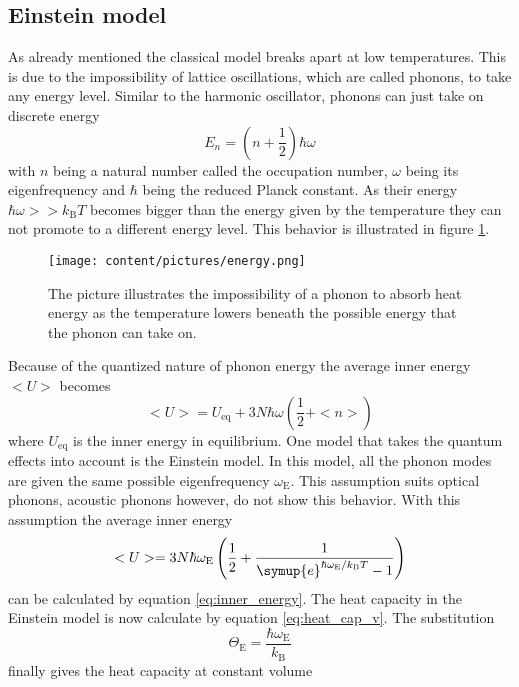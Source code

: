 \subsection{Einstein model}
As already mentioned the classical model breaks apart at low temperatures.
This is due to the impossibility of lattice oscillations, which are called phonons, to take any energy level.
Similar to the harmonic oscillator, phonons can just take on discrete energy
\begin{equation*}
    E_n = (n +\frac{1}{2})\hbar\omega
\end{equation*}
with $n$ being a natural number called the occupation number, $\omega$ being its eigenfrequency and $\hbar$ being the reduced Planck constant.
As their energy $\hbar\omega>>k_\text{B}T$ becomes bigger than the energy given by the temperature they can not promote to a different energy level.
This behavior is illustrated in figure \ref{fig:energy_phonon}.
\begin{figure}
    \centering
    \texttt{[image: content/pictures/energy.png]}
    \caption{The picture illustrates the impossibility of a phonon to absorb heat energy as the temperature lowers beneath the possible energy that the phonon can take on.}
    \label{fig:energy_phonon}
\end{figure}
Because of the quantized nature of phonon energy the average inner energy $<U>$ becomes
\begin{equation}
    <U> = U_\text{eq} + 3N\hbar\omega(\frac{1}{2} + <n>)
    \label{eq:inner_energy}
\end{equation}
where $U_\text{eq}$ is the inner energy in equilibrium.
One model that takes the quantum effects into account is the Einstein model.
In this model, all the phonon modes are given the same possible eigenfrequency $\omega_\text{E}$.
This assumption suits optical phonons, acoustic phonons however, do not show this behavior. 
With this assumption the average inner energy 
\begin{equation*}
    <U> = 3N\hbar\omega_\text{E} \left ( \frac{1}{2} + \frac{1}{\symup{e}^{\hbar\omega_\text{E}/k_\text{B}T} - 1}\right )
\end{equation*}
can be calculated by equation \eqref{eq:inner_energy}.
The heat capacity in the Einstein model is now calculate by equation \eqref{eq:heat_cap_v}.
The substitution 
\begin{equation*}
    \Theta_\text{E} = \frac{\hbar\omega_\text{E}}{k_\text{B}}
\end{equation*}
finally gives the heat capacity at constant volume
